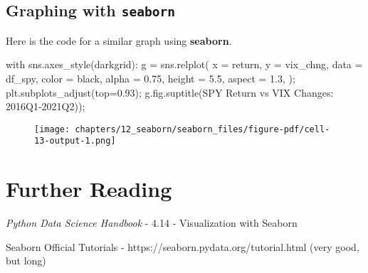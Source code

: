 \documentclass[
  letterpaper,
  DIV=11,
  numbers=noendperiod]{scrreprt}
\newenvironment{Shaded}{\begin{snugshade}}{\end{snugshade}}
\newcommand{\ControlFlowTok}[1]{\textcolor[rgb]{0.00,0.23,0.31}{#1}}
\newcommand{\FloatTok}[1]{\textcolor[rgb]{0.68,0.00,0.00}{#1}}
\newcommand{\NormalTok}[1]{\textcolor[rgb]{0.00,0.23,0.31}{#1}}
\newcommand{\OperatorTok}[1]{\textcolor[rgb]{0.37,0.37,0.37}{#1}}
\newcommand{\StringTok}[1]{\textcolor[rgb]{0.13,0.47,0.30}{#1}}
\begin{document}
\hypertarget{graphing-with-seaborn-2}{%
\subsection{\texorpdfstring{Graphing with
\texttt{seaborn}}{Graphing with seaborn}}\label{graphing-with-seaborn-2}}

Here is the code for a similar graph using \textbf{seaborn}.

\begin{Shaded}
\begin{Highlighting}[]
\ControlFlowTok{with}\NormalTok{ sns.axes\_style(}\StringTok{\textquotesingle{}darkgrid\textquotesingle{}}\NormalTok{):}
\NormalTok{    g }\OperatorTok{=}\NormalTok{ sns.relplot(}
\NormalTok{            x }\OperatorTok{=} \StringTok{\textquotesingle{}return\textquotesingle{}}\NormalTok{,}
\NormalTok{            y }\OperatorTok{=} \StringTok{\textquotesingle{}vix\_chng\textquotesingle{}}\NormalTok{,}
\NormalTok{            data }\OperatorTok{=}\NormalTok{ df\_spy,}
\NormalTok{            color }\OperatorTok{=} \StringTok{\textquotesingle{}black\textquotesingle{}}\NormalTok{,}
\NormalTok{            alpha }\OperatorTok{=} \FloatTok{0.75}\NormalTok{,}
\NormalTok{            height }\OperatorTok{=} \FloatTok{5.5}\NormalTok{,}
\NormalTok{            aspect }\OperatorTok{=} \FloatTok{1.3}\NormalTok{,}
\NormalTok{        )}\OperatorTok{;}
\NormalTok{    plt.subplots\_adjust(top}\OperatorTok{=}\FloatTok{0.93}\NormalTok{)}\OperatorTok{;}
\NormalTok{    g.fig.suptitle(}\StringTok{\textquotesingle{}SPY Return vs VIX Changes: 2016Q1{-}2021Q2)\textquotesingle{}}\NormalTok{)}\OperatorTok{;}
\end{Highlighting}
\end{Shaded}

\begin{figure}[H]

{\centering \texttt{[image: chapters/12\_seaborn/seaborn\_files/figure-pdf/cell-13-output-1.png]}

}

\end{figure}

\hypertarget{further-reading-2}{%
\section{Further Reading}\label{further-reading-2}}

\emph{Python Data Science Handbook} - 4.14 - Visualization with Seaborn

Seaborn Official Tutorials - https://seaborn.pydata.org/tutorial.html
(very good, but long)
\end{document}
